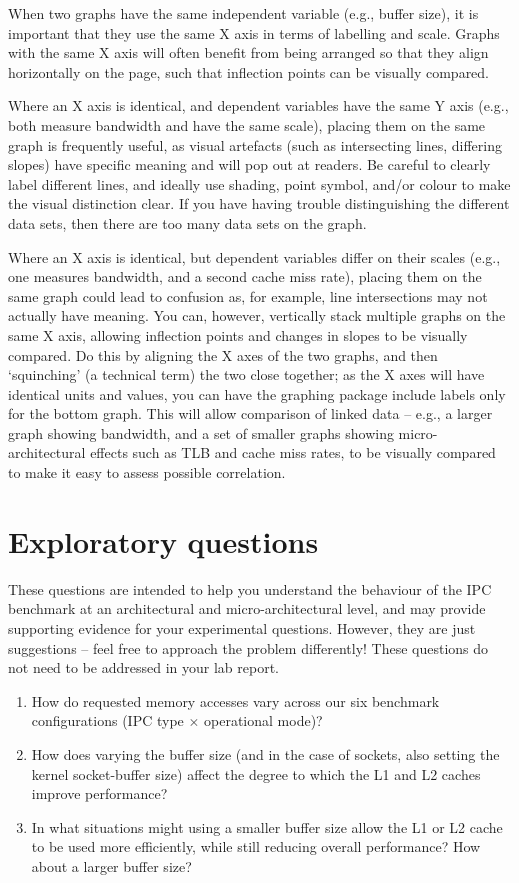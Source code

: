 \documentclass[a4paper,10pt]{article}
\begin{document}
When two graphs have the same independent variable (e.g., buffer size), it is
important that they use the same X axis in terms of labelling and scale.
Graphs with the same X axis will often benefit from being arranged so that
they align horizontally on the page, such that inflection points can be
visually compared.

Where an X axis is identical, and dependent variables have the same Y axis
(e.g., both measure bandwidth and have the same scale), placing them on the
same graph is frequently useful, as visual artefacts (such as intersecting
lines, differing slopes) have specific meaning and will pop out at readers.
Be careful to clearly label different lines, and ideally use shading, point
symbol, and/or colour to make the visual distinction clear.
If you have having trouble distinguishing the different data sets, then there
are too many data sets on the graph.

Where an X axis is identical, but dependent variables differ on their scales
(e.g., one measures bandwidth, and a second cache miss rate), placing them on
the same graph could lead to confusion as, for example, line intersections may
not actually have meaning.
You can, however, vertically stack multiple graphs on the same X axis,
allowing inflection points and changes in slopes to be visually compared.
Do this by aligning the X axes of the two graphs, and then `squinching' (a
technical term) the two close together; as the X axes will have identical
units and values, you can have the graphing package include labels only for
the bottom graph.
This will allow comparison of linked data -- e.g., a larger graph showing
bandwidth, and a set of smaller graphs showing micro-architectural effects
such as TLB and cache miss rates, to be visually compared to make it easy to
assess possible correlation.

\section*{Exploratory questions}

These questions are intended to help you understand the behaviour of the IPC
benchmark at an architectural and micro-architectural level, and may provide
supporting evidence for your experimental questions.
However, they are just suggestions -- feel free to approach the problem
differently!
These questions do not need to be addressed in your lab report.

\begin{enumerate}
  \item How do requested memory accesses vary across our six benchmark
    configurations (IPC type $\times$ operational mode)?
  \item How does varying the buffer size (and in the case of sockets, also
    setting the kernel socket-buffer size) affect the degree to which the L1
    and L2 caches improve performance?
  \item In what situations might using a smaller buffer size allow the L1 or
    L2 cache to be used more efficiently, while still reducing overall
    performance?  How about a larger buffer size?
\end{enumerate}
\end{document}
